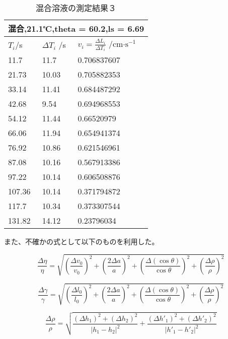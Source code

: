 \documentclass{jsarticle}
\begin{document}
\begin{table}[H]
\centering
\caption{混合溶液の測定結果３}
\label{my-label}
\begin{tabular}{|l|l|l|}
\hline
\multicolumn{3}{|l|}{混合,21.1℃,theta = 60.2,ls = 6.69} \\ \hline
$T_i $/s   & $\Delta T_i $ /s  & $v_i = \frac{\Delta L_i}{\Delta T_i}$ /cm$\cdot \textrm{s}^{-1}$   \\ \hline
11.7            & 11.7          & 0.706837607         \\ \hline
21.73           & 10.03         & 0.705882353         \\ \hline
33.14           & 11.41         & 0.684487292         \\ \hline
42.68           & 9.54          & 0.694968553         \\ \hline
54.12           & 11.44         & 0.66520979          \\ \hline
66.06           & 11.94         & 0.654941374         \\ \hline
76.92           & 10.86         & 0.621546961         \\ \hline
87.08           & 10.16         & 0.567913386         \\ \hline
97.22           & 10.14         & 0.606508876         \\ \hline
107.36          & 10.14         & 0.371794872         \\ \hline
117.7           & 10.34         & 0.373307544         \\ \hline
131.82          & 14.12         & 0.23796034          \\ \hline
\end{tabular}
\end{table}

また、不確かの式として以下のものを利用した。

\begin{equation}
    \frac{\Delta\eta}{\eta} = \sqrt{(\frac{\Delta v_0}{v_0})^2+(\frac{2\Delta a}{a})^2+(\frac{\Delta(\cos{\theta})}{\cos{\theta}})^2+(\frac{\Delta \rho}{\rho})^2}
\end{equation}

\begin{equation}
    \frac{\Delta\gamma}{\gamma} = \sqrt{(\frac{\Delta l_0}{l_0})^2+(\frac{2\Delta a}{a})^2+(\frac{\Delta(\cos{\theta})}{\cos{\theta}})^2+(\frac{\Delta \rho}{\rho})^2}
\end{equation}

\begin{equation}
    \frac{\Delta\rho}{\rho} = \sqrt{\frac{(\Delta h_1)^2+(\Delta h_2)^2}{|h_1 - h_2|^2} + \frac{(\Delta h'_1)^2+(\Delta h'_2)^2}{|h'_1 - h'_2|^2}}
\end{equation}
\end{document}
